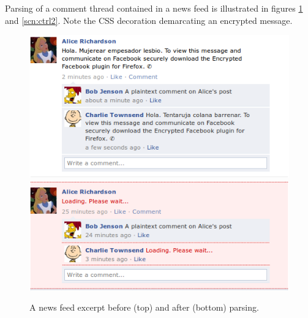 Parsing of a comment thread contained in a news feed is illustrated in figures \ref{scn:ctrl} and \ref{scn:ctrl2}. Note the CSS decoration demarcating an encrypted message.

    \begin{figure}[tbph]
        \begin{center}
                \includegraphics[width=12cm]{screens/content1.png}
                \includegraphics[width=12cm]{screens/content4.png}
            \caption{A news feed excerpt before (top) and after (bottom) parsing.}
            \label{scn:ctrl}
        \end{center}
    \end{figure}
    

